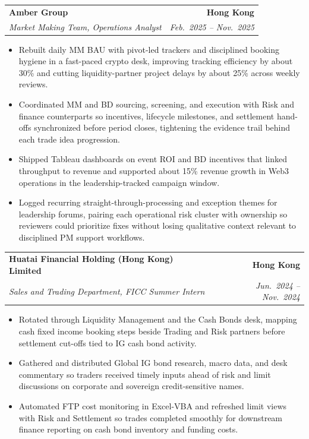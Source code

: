 \documentclass[9pt,a4paper]{extarticle}
\makeatletter
\newcommand{\resumeSubheading}[4]{%
  \vspace{0.6em}%
  \begin{tabular*}{\textwidth}{l@{\extracolsep{\fill}}r}
    \textbf{#1} & \textbf{#2} \\
    \textit{\small #3} & \textit{\small #4} \\
  \end{tabular*}\vspace{0.32em}}
\makeatother
\begin{document}
\resumeSubheading{Amber Group}{Hong Kong}{Market Making Team, Operations Analyst}{Feb.\ 2025 -- Nov.\ 2025}
\begin{itemize}
  \item Rebuilt daily MM BAU with pivot-led trackers and disciplined booking hygiene in a fast-paced crypto desk, improving tracking efficiency by about 30\% and cutting liquidity-partner project delays by about 25\% across weekly reviews.
  \item Coordinated MM and BD sourcing, screening, and execution with Risk and finance counterparts so incentives, lifecycle milestones, and settlement hand-offs synchronized before period closes, tightening the evidence trail behind each trade idea progression.
  \item Shipped Tableau dashboards on event ROI and BD incentives that linked throughput to revenue and supported about 15\% revenue growth in Web3 operations in the leadership-tracked campaign window.
  \item Logged recurring straight-through-processing and exception themes for leadership forums, pairing each operational risk cluster with ownership so reviewers could prioritize fixes without losing qualitative context relevant to disciplined PM support workflows.
\end{itemize}

\resumeSubheading{Huatai Financial Holding (Hong Kong) Limited}{Hong Kong}{Sales and Trading Department, FICC Summer Intern}{Jun.\ 2024 -- Nov.\ 2024}
\begin{itemize}
  \item Rotated through Liquidity Management and the Cash Bonds desk, mapping cash fixed income booking steps beside Trading and Risk partners before settlement cut-offs tied to IG cash bond activity.
  \item Gathered and distributed Global IG bond research, macro data, and desk commentary so traders received timely inputs ahead of risk and limit discussions on corporate and sovereign credit-sensitive names.
  \item Automated FTP cost monitoring in Excel-VBA and refreshed limit views with Risk and Settlement so trades completed smoothly for downstream finance reporting on cash bond inventory and funding costs.
\end{itemize}
\end{document}
